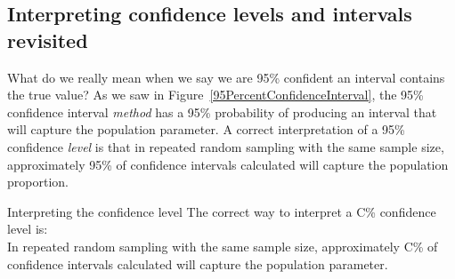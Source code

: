 %


%


\subsection{Interpreting confidence levels and intervals revisited}
\label{interpretingCIs}


What do we really mean when we say we are 95\% confident an interval contains the true value?  As we saw in Figure~\ref{95PercentConfidenceInterval}, the 95\% confidence interval \emph{method} has a 95\% probability of producing an interval that will capture the population parameter. A correct interpretation of a 95\% confidence \emph{level} is that in repeated random sampling with the same sample size, approximately 95\% of confidence intervals calculated will capture the population proportion. 

\begin{onebox}{Interpreting the confidence level}
The correct way to interpret a C\% confidence level is:\\

In repeated random sampling with the same sample size, approximately C\% of confidence intervals calculated will capture the population parameter.
\end{onebox}

